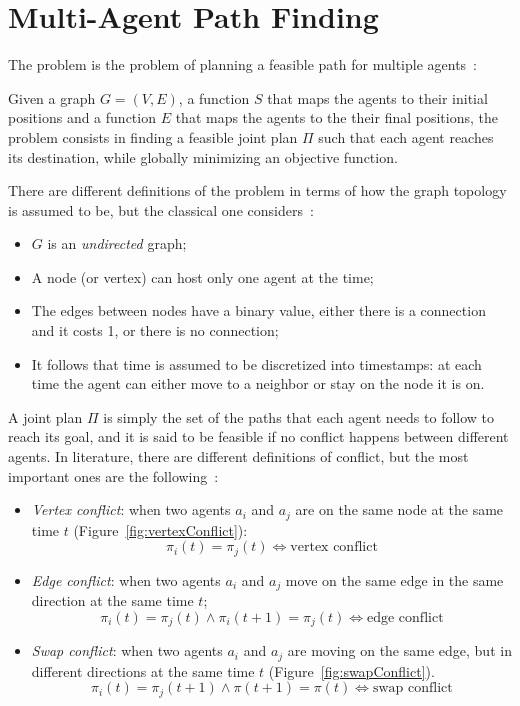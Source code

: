 \section{Multi-Agent Path Finding}
\label{sec:MAPF}
The  problem is the problem of planning a feasible path for multiple
agents~\cite{MAPF_definitions}:
\begin{definition}
  Given a graph $G=(V,E)$, a function $S$ that maps the agents to their initial
  positions and a function $E$ that maps the agents to the their final
  positions, the problem consists in finding a feasible joint plan $\Pi$ such
  that each agent reaches its destination, while globally minimizing an
  objective function.
\end{definition}
There are different definitions of the problem in terms of how the graph 
topology is assumed to be, but the classical one
considers~\cite{MAPF_definitions}:
\begin{itemize}
  \item $G$ is an \textit{undirected} graph;
  \item A node (or vertex) can host only one agent at the time;
  \item The edges between nodes have a binary value, either there is a
    connection and it costs 1, or there is no connection;
  \item It follows that time is assumed to be discretized into timestamps: at
    each time the agent can either move to a neighbor or stay on the node it is
    on. 
\end{itemize}
A joint plan $\Pi$ is simply the set of the paths that each agent needs to
follow to reach its goal, and it is said to be feasible if no conflict 
happens between different agents. In literature, there are different 
definitions of conflict, but the most important ones are the 
following~\cite{MAPF_overview}: 
\begin{itemize}
  \item \textit{Vertex conflict}: when two agents $a_i$ and $a_j$ are on the 
    same node at the same time $t$ (Figure~\ref{fig:vertexConflict}):
    \[\pi_i(t) = \pi_j(t) \iff \text{vertex conflict}\]
  \item \textit{Edge conflict}: when two agents $a_i$ and $a_j$ move on the 
    same edge in the same direction at the same time $t$;
    \[\pi_i(t) = \pi_j(t) \wedge \pi_i(t+1) = \pi_j(t) \iff \text{edge 
      conflict}\]
  \item \textit{Swap conflict}: when two agents $a_i$ and $a_j$ are moving on 
    the same edge, but in different directions at the same time $t$
    (Figure~\ref{fig:swapConflict}). 
    \[\pi_i(t) = \pi_j(t+1) \wedge \pi(t+1) = \pi(t) \iff \text{swap 
      conflict}\]
\end{itemize}
